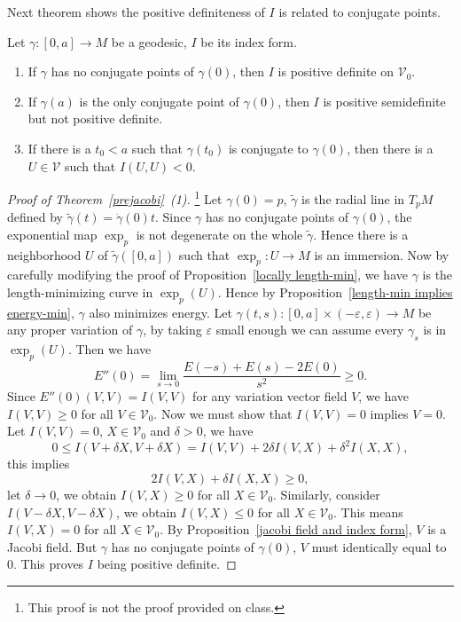 Next theorem shows the positive definiteness of $I$ is related to conjugate points.
\begin{thm}\label{prejacobi}
    Let $\gamma:[0,a]\to M$ be a geodesic, $I$ be its index form.
    \begin{enumerate}[(1)]
        \item If $\gamma$ has no conjugate points of $\gamma(0)$, then $I$ is positive definite on $\mathscr{V}_0$.
        \item If $\gamma(a)$ is the only conjugate point of $\gamma(0)$, then $I$ is positive semidefinite but not positive definite.
        \item If there is a $t_0<a$ such that $\gamma(t_0)$ is conjugate to $\gamma(0)$, then there is a $U\in\mathscr{V}$ such that $I(U,U)<0$.
    \end{enumerate}
\end{thm}
\begin{proof}[Proof of Theorem~\ref{prejacobi}~(1)]\footnote{This proof is not the proof provided on class.}
    Let $\gamma(0)=p$, $\tilde{\gamma}$ is the radial line in $T_pM$ defined by $\tilde{\gamma}(t)=\dot{\gamma}(0)t$.
    Since $\gamma$ has no conjugate points of $\gamma(0)$, the exponential map $\exp_p$ is not degenerate on the whole $\tilde\gamma$.
    Hence there is a neighborhood $U$ of $\tilde{\gamma}([0,a])$ such that $\exp_p:U\to M$ is an immersion.
    Now by carefully modifying the proof of Proposition~\ref{locally length-min}, we have $\gamma$ is the length-minimizing curve in $\exp_p(U)$.
    Hence by Proposition~\ref{length-min implies energy-min}, $\gamma$ also minimizes energy.
    Let $\gamma(t,s):[0,a]\times(-\varepsilon,\varepsilon)\to M$ be any proper variation of $\gamma$, by taking $\varepsilon$ small enough we can assume every $\gamma_s$ is in $\exp_p(U)$.
    Then we have
    \[E''(0)=\lim_{s\to 0}\frac{E(-s)+E(s)-2E(0)}{s^2}\geq 0.\]
    Since $E''(0)(V,V)=I(V,V)$ for any variation vector field $V$, we have $I(V,V)\geq 0$ for all $V\in\mathscr{V}_0$.
    Now we must show that $I(V,V)=0$ implies $V=0$.
    Let $I(V,V)=0$, $X\in\mathscr{V}_0$ and $\delta>0$, we have
    \[0\leq I(V+\delta X,V+\delta X)=I(V,V)+2\delta I(V,X)+\delta^2 I(X,X),\]
    this implies
    \[2I(V,X)+\delta I(X,X)\geq 0,\]
    let $\delta\to 0$, we obtain $I(V,X)\geq 0$ for all $X\in\mathscr{V}_0$.
    Similarly, consider $I(V-\delta X,V-\delta X)$, we obtain $I(V,X)\leq 0$ for all $X\in\mathscr{V}_0$.
    This means $I(V,X)=0$ for all $X\in\mathscr{V}_0$.
    By Proposition~\ref{jacobi field and index form}, $V$ is a Jacobi field.
    But $\gamma$ has no conjugate points of $\gamma(0)$, $V$ must identically equal to $0$.
    This proves $I$ being positive definite.
\end{proof}

